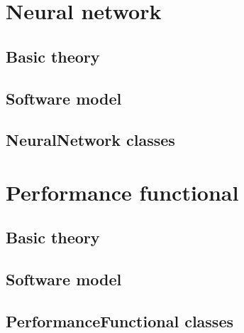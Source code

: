 \documentclass[pdftex, a4paper, 10pt]{book}
\begin{document}

\chapter{Neural network}\label{NeuralNetwork}


\section{Basic theory}\label{NeuralNetworkBasicTheory}


\section{Software model}\label{NeuralNetworkSoftwareModel}


\section{NeuralNetwork classes}\label{NeuralNetworkClassese}


 
\chapter{Performance functional}\label{PerformanceFunctional}


\section{Basic theory}\label{PerformanceFunctionalBasicTheory}


\section{Software model}\label{PerformanceFunctionalModel}


\section{PerformanceFunctional classes}\label{PerformanceFunctionalClasses}

\end{document}
